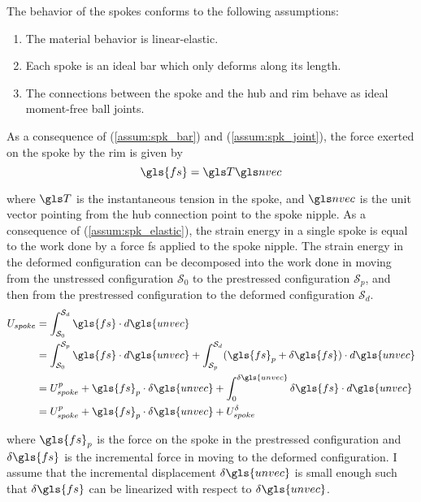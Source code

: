 \documentclass[\rootdir/thesis.tex]{subfiles}
\begin{document}
The behavior of the spokes conforms to the following assumptions:

\begin{enumerate}
    \item{The material behavior is linear-elastic.}\label{assum:spk_elastic}
    \item{Each spoke is an ideal bar which only deforms along its length.}\label{assum:spk_bar}
    \item{The connections between the spoke and the hub and rim behave as ideal moment-free ball joints.}\label{assum:spk_joint}
\end{enumerate}

As a consequence of (\ref{assum:spk_bar}) and (\ref{assum:spk_joint}), the force exerted on the spoke by the rim is given by
\begin{equation}
\label{eq:spk_force}
\gls{fs} = \T\n
\end{equation}

where $\T$ is the instantaneous tension in the spoke, and $\n$ is the unit vector pointing from the hub connection point to the spoke nipple. As a consequence of (\ref{assum:spk_elastic}), the strain energy in a single spoke is equal to the work done by a force \gls{fs} applied to the spoke nipple. The strain energy in the deformed configuration can be decomposed into the work done in moving from the unstressed configuration $\mathcal{S}_0$ to the prestressed configuration $\mathcal{S}_p$, and then from the prestressed configuration to the deformed configuration $\mathcal{S}_d$.
\begin{align}
\begin{split}
\label{eq:U_spoke}
U_{spoke} &= \int_{\mathcal{S}_0}^{\mathcal{S}_d} \gls{fs} \cdot d\gls{unvec}\\
          &= \int_{\mathcal{S}_0}^{\mathcal{S}_p} \gls{fs} \cdot d\gls{unvec} +
             \int_{\mathcal{S}_p}^{\mathcal{S}_d} (\gls{fs}_p + \delta\gls{fs}) \cdot d\gls{unvec}\\
          &= U_{spoke}^p + \gls{fs}_p \cdot \delta\gls{unvec} +
             \int_{0}^{\delta\gls{unvec}} \delta\gls{fs} \cdot d\gls{unvec}\\
          &= U_{spoke}^p + \gls{fs}_p \cdot \delta\gls{unvec} + U_{spoke}^{\delta}
\end{split}
\end{align}

where $\gls{fs}_p$ is the force on the spoke in the prestressed configuration and $\delta\gls{fs}$ is the incremental force in moving to the deformed configuration. I assume that the incremental displacement $\delta\gls{unvec}$ is small enough such that $\delta\gls{fs}$ can be linearized with respect to $\delta\gls{unvec}$.
\end{document}
